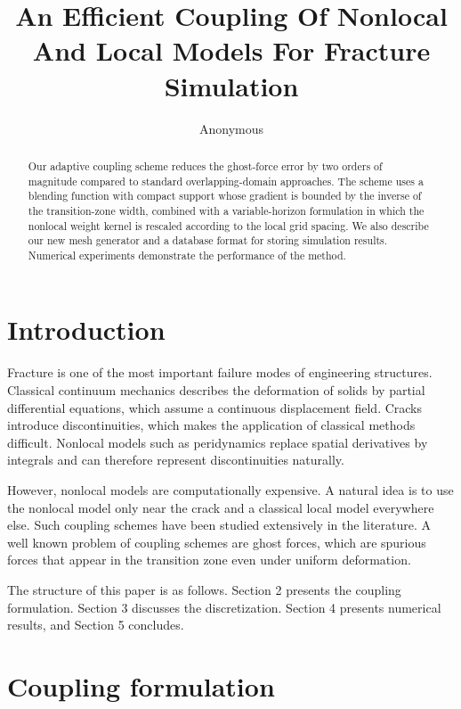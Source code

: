 \documentclass{article}
\begin{document}
\title{An Efficient Coupling Of Nonlocal And Local Models For Fracture Simulation}
\author{Anonymous}
\maketitle

\begin{abstract}
Our adaptive coupling scheme reduces the ghost-force error by two orders of
magnitude compared to standard overlapping-domain approaches. The scheme uses
a blending function with compact support whose gradient is bounded by the
inverse of the transition-zone width, combined with a variable-horizon
formulation in which the nonlocal weight kernel is rescaled according to the
local grid spacing. We also describe our new mesh generator and a database
format for storing simulation results. Numerical experiments demonstrate the
performance of the method.
\end{abstract}

\section{Introduction}

Fracture is one of the most important failure modes of engineering
structures. Classical continuum mechanics describes the deformation of solids
by partial differential equations, which assume a continuous displacement
field. Cracks introduce discontinuities, which makes the application of
classical methods difficult. Nonlocal models such as peridynamics replace
spatial derivatives by integrals and can therefore represent discontinuities
naturally.

However, nonlocal models are computationally expensive. A natural idea is to
use the nonlocal model only near the crack and a classical local model
everywhere else. Such coupling schemes have been studied extensively in the
literature. A well known problem of coupling schemes are ghost forces, which
are spurious forces that appear in the transition zone even under uniform
deformation.

The structure of this paper is as follows. Section 2 presents the coupling
formulation. Section 3 discusses the discretization. Section 4 presents
numerical results, and Section 5 concludes.

\section{Coupling formulation}
\end{document}
